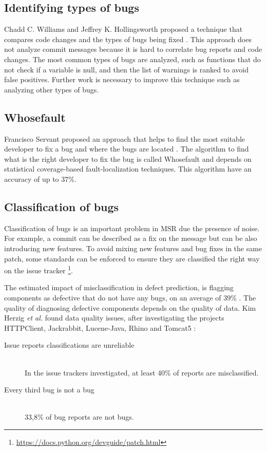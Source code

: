 \subsection{Identifying types of bugs}
Chadd C. Williams and Jeffrey K. Hollingsworth proposed a technique that
compares code changes and the types of bugs being fixed
\cite{ChaddC.WilliamsandJeffreyK.Hollingsworth2005}. This approach does not
analyze commit messages because it is hard to correlate bug reports and code
changes. The most common types of bugs are analyzed, such as functions that do
not check if a variable is null, and then the list of warnings is ranked to
avoid false positives. Further work is necessary to improve this technique such
as analyzing other types of bugs.

\subsection{Whosefault}
Francisco Servant proposed an approach that helps to find the most suitable
developer to fix a bug and where the bugs are located \cite{Servant1}. The
algorithm to find what is the right developer to fix the bug is called
Whosefault and depends on statistical coverage-based fault-localization
techniques. This algorithm have an accuracy of up to 37\%.

\subsection{Classification of bugs}
Classification of bugs is an important problem in MSR due the presence of noise.
For example, a commit can be described as a fix on the message but can be also
introducing new features. To avoid mixing new features and bug fixes in the
same patch, some standards can be enforced to ensure they are classified the
right way on the issue tracker
\footnote{\url{https://docs.python.org/devguide/patch.html}}.

The estimated impact of misclassification in defect prediction, is flagging
components as defective that do not have any bugs, on an average of 39\%
\cite{herzig-tr-2012}. The quality of diagnosing defective components depends
on the quality of data. Kim Herzig \textit{et al.} found data quality issues,
after investigating the projects HTTPClient, Jackrabbit, Lucene-Java, Rhino
and Tomcat5 \cite{herzig-tr-2012}:

\begin{description}
  \item[Issue reports classifications are unreliable] \hfill \\
  In the issue trackers investigated, at least 40\% of reports are misclassified.
  \item[Every third bug is not a bug] \hfill \\
  33,8\% of bug reports are not bugs.
\end{description}

